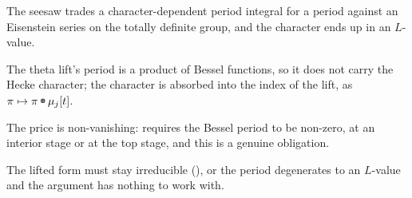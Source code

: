 \begin{keytakeaways}
\item The seesaw trades a character-dependent period integral for a period
against an Eisenstein series on the totally definite group, and the character
ends up in an $L$-value.
\item The theta lift's period is a product of Bessel functions, so it does
not carry the Hecke character; the character is absorbed into the index of
the lift, as $\pi \mapsto \pi \tboxplus \mu_j[t]$.
\item The price is non-vanishing:  requires the Bessel period to
be non-zero, at an interior stage or at the top stage, and this is a genuine
obligation.
\item The lifted form must stay irreducible (), or the period
degenerates to an $L$-value and the argument has nothing to work with.
\end{keytakeaways}
